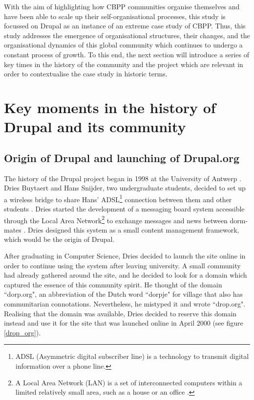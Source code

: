 With the aim of highlighting how CBPP communities organise themselves and have been able to scale up their self-organisational processes, this study is focussed on Drupal as an instance of an extreme case study of CBPP. Thus, this study addresses the emergence of organisational structures, their changes, and the organisational dynamics of this global community which continues to undergo a constant process of growth. To this end, the next section will introduce a series of key times in the history of the community and the project which are relevant in order to contextualise the case study in historic terms.

\section{Key moments in the history of Drupal and its community}
\label{sec:drupal-history}

\subsection{Origin of Drupal and launching of Drupal.org}

The history of the Drupal project began in 1998 at the University of Antwerp \parencite[822]{benjamin2011definitive}. Dries Buytaert and Hans Snijder, two undergraduate students, decided to set up a wireless bridge to share Hans' ADSL\footnote{ADSL (Asymmetric digital subscriber line) is a technology to transmit digital information over a phone line.} connection between them and other students \parencite{drupal-history:2017:Online}. Dries started the development of a messaging board system accessible through the Local Area Network\footnote{A Local Area Network (LAN) is a set of interconnected computers within a limited relatively small area, such as  a house or an office \parencite{lan:2017:Online}.} to exchange messages and news between dorm-mates \parencite[822]{benjamin2011definitive}. Dries designed this system as a small content management framework, which would be the origin of Drupal.

After graduating in Computer Science, Dries decided to launch the site online in order to continue using the system after leaving university. A small community had already gathered around the site, and he decided to look for a domain which captured the essence of this community spirit. He thought of the domain ``dorp.org", an abbreviation of the Dutch word ``dorpje" for village that also has communitarian connotations. Nevertheless, he mistyped it and wrote ``drop.org". Realising that the domain was available, Dries decided to reserve this domain instead and use it for the site that was launched online in April 2000 (see figure \ref{drop_org}).

